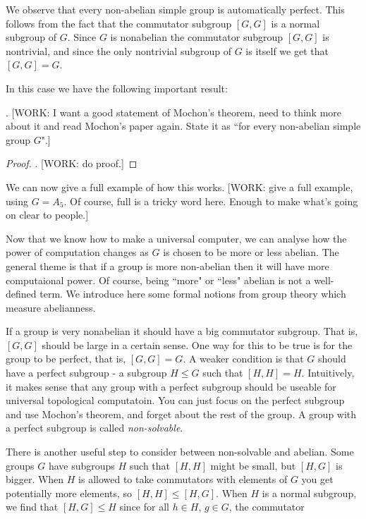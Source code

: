 We observe that every non-abelian simple group is automatically perfect. This follows from the fact that the commutator subgroup $[G,G]$ is a normal subgroup of $G$. Since $G$ is nonabelian the commutator subgroup $[G,G]$ is nontrivial, and since the only nontrivial subgroup of $G$ is itself we get that $[G,G]=G$.

In this case we have the following important result:

\begin{theorem}[Mochon] . [WORK: I want a good statement of Mochon's theorem, need to think more about it and read Mochon's paper again. State it as ``for every non-abelian simple group $G$".]
\end{theorem}
\begin{proof} . [WORK: do proof.]
\end{proof}

We can now give a full example of how this works. [WORK: give a full example, using $G=A_5$. Of course, full is a tricky word here. Enough to make what's going on clear to people.]

Now that we know how to make a universal computer, we can analyse how the power of computation changes as $G$ is chosen to be more or less abelian. The general theme is that if a group is more non-abelian then it will have more computaional power. Of course, being ``more" or ``less" abelian is not a well-defined term. We introduce here some formal notions from group theory which measure abelianness.

If a group is very nonabelian it should have a big commutator subgroup. That is, $[G,G]$ should be large in a certain sense. One way for this to be true is for the group to be perfect, that is, $[G,G]=G$. A weaker condition is that $G$ should have a perfect subgroup - a subgroup $H\leq G$ such that $[H,H]=H$. Intuitively, it makes sense that any group with a perfect subgroup should be useable for universal topological computatoin. You can just focus on the perfect subgroup and use Mochon's theorem, and forget about the rest of the group. A group with a perfect subgroup is called \textit{non-solvable}.

There is another useful step to consider between non-solvable and abelian. Some groups $G$ have subgroups $H$ such that $[H,H]$ might be small, but $[H,G]$ is bigger. When $H$ is allowed to take commutators with elements of $G$ you get potentially more elements, so $[H,H]\leq [H,G]$. When $H$ is a normal subgroup, we find that $[H,G]\leq H$ since for all $h\in H$, $g\in G$, the commutator

